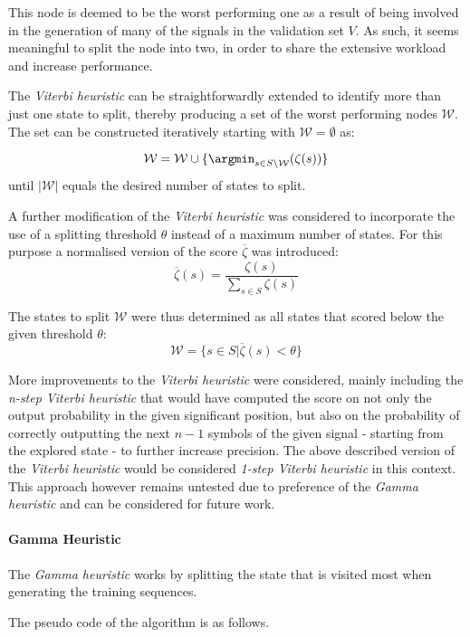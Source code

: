 This node is deemed to be the worst performing one as a result of being involved in the generation of many of the signals in the validation set $V$. As such, it seems meaningful to split the node into two, in order to share the extensive workload and increase performance.

The \emph{Viterbi heuristic} can be straightforwardly extended to identify more than just one state to split, thereby producing a set of the worst performing nodes $\mathcal{W}$. The set can be constructed iteratively starting with $\mathcal{W} = \emptyset$ as:

$$\mathcal{W} = \mathcal{W} \cup \{\argmin_{s\in S\setminus \mathcal{W}}(\zeta(s))\}$$
until $|\mathcal{W}|$ equals the desired number of states to split.

A further modification of the \emph{Viterbi heuristic} was considered to incorporate the use of a splitting threshold $\theta$ instead of a maximum number of states. For this purpose a normalised version of the score $\overline{\zeta}$ was introduced:
$$\overline{\zeta}(s) = \frac{\zeta(s)}{\sum_{s\in S}\zeta(s)}$$

The states to split $\mathcal{W}$ were thus determined as all states that scored below the given threshold $\theta$:
$$\mathcal{W} = \{s\in S|\overline\zeta(s) < \theta\}$$

More improvements to the \emph{Viterbi heuristic} were considered, mainly including the \emph{n-step Viterbi heuristic} that would have computed the score on not only the output probability in the given significant position, but also on the probability of correctly outputting the next $n -1$ symbols of the given signal - starting from the explored state - to further increase precision. The above described version of the \emph{Viterbi heuristic} would be considered \emph{1-step Viterbi heuristic} in this context. This approach however remains untested due to preference of the \emph{Gamma heuristic} and can be considered for future work.

\paragraph{Gamma Heuristic}

The \emph{Gamma heuristic} works by splitting the state that is visited most when generating the 
training sequences.

The pseudo code of the algorithm is as follows.

